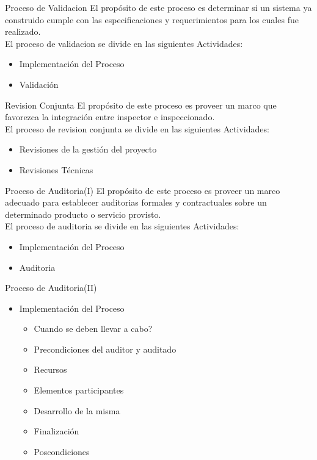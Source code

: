 \documentclass{beamer}
\begin{document}
				\begin{frame}{Proceso de Validacion}
					El propósito de este proceso es determinar si un sistema ya construido cumple con las especificaciones y requerimientos para los cuales fue realizado.\\
					
					El proceso de validacion se divide en las siguientes Actividades:\pause
					\begin{itemize}
						\item Implementación del Proceso\pause
						\item Validación
					\end{itemize}
				\end{frame}
			
				\begin{frame}{Revision Conjunta}
					El propósito de este proceso es proveer un marco que favorezca la integración entre inspector e inspeccionado.\\
					El proceso de revision conjunta se divide en las siguientes Actividades:\pause
					\begin{itemize}
						\item Revisiones de la gestión del proyecto\pause
						\item Revisiones Técnicas
					\end{itemize} 
				\end{frame}
			
				\begin{frame}{Proceso de Auditoria(I)}
					 El propósito de este proceso es proveer un marco adecuado para establecer auditorias formales y contractuales sobre un determinado producto o servicio provisto.\\
					 
					 El proceso de auditoria se divide en las siguientes Actividades:\pause
					 \begin{itemize}
					 	\item Implementación del Proceso\pause
						\item Auditoria
					 \end{itemize}
				\end{frame}
			
			\begin{frame}{Proceso de Auditoria(II)}
				\begin{itemize}
					\item Implementación del Proceso\pause
					\begin{itemize}
						\item Cuando se deben llevar a cabo?\pause
						\item Precondiciones del auditor y auditado\pause
						\item Recursos\pause
						\item Elementos participantes\pause
						\item Desarrollo de la misma\pause
						\item Finalización\pause
						\item Poscondiciones
					\end{itemize}
				\end{itemize}
			\end{frame}
			
\end{document}
